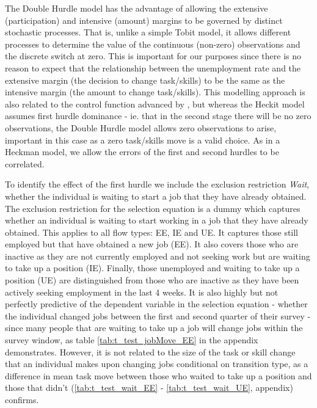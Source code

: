 \documentclass[12pt,authoryear]{elsarticle}
\begin{document}
	
	The Double Hurdle model has the advantage of allowing the extensive (participation) and intensive (amount) margins to be governed by distinct stochastic processes. That is, unlike a simple Tobit model, it allows different processes to determine the value of the continuous (non-zero) observations and the discrete switch at zero. This is important for our purposes since there is no reason to expect that the relationship between the unemployment rate and the extensive margin (the decision to change task/skills) to be the same as the intensive margin (the amount to change task/skills). This modelling approach is also related to the control function advanced by \cite{Heckman}, but whereas the Heckit model assumes first hurdle dominance - ie. that in the second stage there will be no zero observations, the Double Hurdle model allows zero observations to arise, important in this case as a zero task/skills move is a valid choice. As in a Heckman model, we allow the errors of the first and second hurdles to be correlated.
	
	\vspace{2mm}
	
	 To identify the effect of the first hurdle we include the exclusion restriction \textit{Wait}, whether the individual is waiting to start a job that they have already obtained. The exclusion restriction for the selection equation is a dummy which captures whether an individual is waiting to start working in a job that they have already obtained. This applies to all flow types: EE, IE and UE. It captures those still employed but that have obtained a new job (EE). It also covers those who are inactive as they are not currently employed and not seeking work but are waiting to take up a position (IE). Finally, those unemployed and waiting to take up a position (UE) are distinguished from those who are inactive as they have been actively seeking employment in the last 4 weeks. It is also highly but not perfectly predictive of the dependent variable in the selection equation - whether the individual changed jobs between the first and second quarter of their survey - since many people that are waiting to take up a job will change jobs within the survey window, as table \ref{tab:t_test_jobMove_EE} in the appendix demonstrates. However, it is not related to the size of the task or skill change that an individual makes upon changing jobs conditional on transition type, as a difference in mean task move between those who waited to take up a position and those that didn't (\ref{tab:t_test_wait_EE} - \ref{tab:t_test_wait_UE}, appendix) confirms.
	
\end{document}
